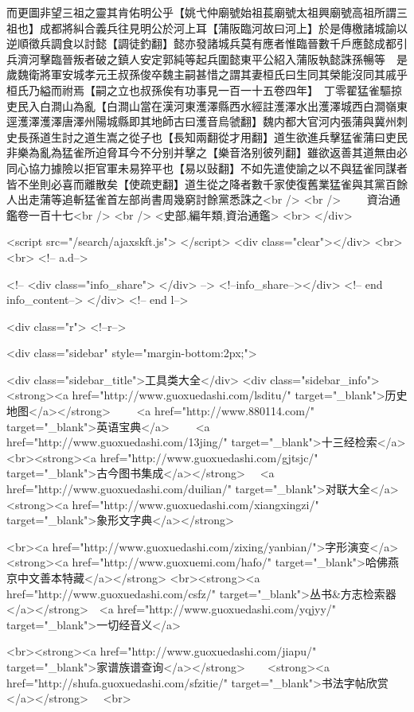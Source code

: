 而更圖非望三祖之靈其肯佑明公乎【姚弋仲廟號始祖萇廟號太祖興廟號高祖所謂三祖也】成都將糾合義兵往見明公於河上耳【蒲阪臨河故曰河上】於是傳檄諸城諭以逆順徵兵調食以討懿【調徒釣翻】懿亦發諸城兵莫有應者惟臨晉數千戶應懿成都引兵濟河擊臨晉叛者破之鎮人安定郭純等起兵圍懿東平公紹入蒲阪執懿誅孫暢等　是歲魏衛將軍安城孝元王叔孫俊卒魏主嗣甚惜之謂其妻桓氏曰生同其榮能沒同其戚乎桓氏乃縊而祔焉【嗣之立也叔孫俟有功事見一百一十五卷四年】　丁零翟猛雀驅掠吏民入白澗山為亂【白澗山當在漢河東濩澤縣西水經註濩澤水出濩澤城西白澗嶺東逕濩澤濩澤唐澤州陽城縣即其地師古曰濩音烏虢翻】魏内都大官河内張蒲與冀州刺史長孫道生討之道生嵩之從子也【長知兩翻從才用翻】道生欲進兵擊猛雀蒲曰吏民非樂為亂為猛雀所迫脅耳今不分别并擊之【樂音洛别彼列翻】雖欲返善其道無由必同心協力據險以拒官軍未易猝平也【易以䜴翻】不如先遣使諭之以不與猛雀同謀者皆不坐則必喜而離散矣【使疏吏翻】道生從之降者數千家使復舊業猛雀與其黨百餘人出走蒲等追斬猛雀首左部尚書周幾窮討餘黨悉誅之<br />
<br />
　　資治通鑑卷一百十七<br />
<br />
<史部,編年類,資治通鑑>  <br>
   </div> 

<script src="/search/ajaxskft.js"> </script>
 <div class="clear"></div>
<br>
<br>
 <!-- a.d-->

 <!--
<div class="info_share">
</div> 
-->
 <!--info_share--></div>   <!-- end info_content-->
  </div> <!-- end l-->

<div class="r">   <!--r-->



<div class="sidebar"  style="margin-bottom:2px;">

 
<div class="sidebar_title">工具类大全</div>
<div class="sidebar_info">
<strong><a href="http://www.guoxuedashi.com/lsditu/" target="_blank">历史地图</a></strong>　　
<a href="http://www.880114.com/" target="_blank">英语宝典</a>　　
<a href="http://www.guoxuedashi.com/13jing/" target="_blank">十三经检索</a>　
<br><strong><a href="http://www.guoxuedashi.com/gjtsjc/" target="_blank">古今图书集成</a></strong>　
<a href="http://www.guoxuedashi.com/duilian/" target="_blank">对联大全</a>　<strong><a href="http://www.guoxuedashi.com/xiangxingzi/" target="_blank">象形文字典</a></strong>　

<br><a href="http://www.guoxuedashi.com/zixing/yanbian/">字形演变</a>　　<strong><a href="http://www.guoxuemi.com/hafo/" target="_blank">哈佛燕京中文善本特藏</a></strong>
<br><strong><a href="http://www.guoxuedashi.com/csfz/" target="_blank">丛书&方志检索器</a></strong>　<a href="http://www.guoxuedashi.com/yqjyy/" target="_blank">一切经音义</a>　　

<br><strong><a href="http://www.guoxuedashi.com/jiapu/" target="_blank">家谱族谱查询</a></strong>　　<strong><a href="http://shufa.guoxuedashi.com/sfzitie/" target="_blank">书法字帖欣赏</a></strong>　
<br>

